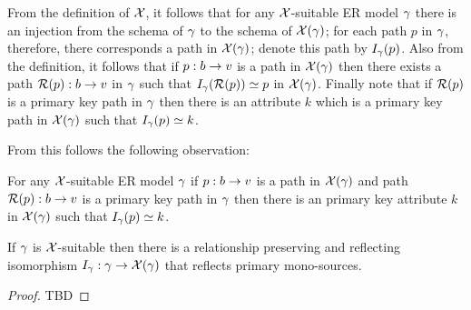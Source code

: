 From the definition of $\mathcal{X}$, it follows that for any $\mathcal{X}$-suitable ER model $\gamma$ there is an injection from the schema of $\gamma$ to the schema of $\mathcal{X}(\gamma)$; for each path $p$ in $\gamma$, therefore, there corresponds a path 
in $\mathcal{X}(\gamma)$; denote this path by  $I_\gamma(p)$. Also from the definition, it follows that
if $p:b \rightarrow v$ is a path in $\mathcal{X}(\gamma)$ then there exists a path $\mathcal{R}(p):b \rightarrow v$ in $\gamma$ such that $I_\gamma(\mathcal{R}(p)) \simeq p$ in $\mathcal{X}(\gamma)$. Finally note that if $\mathcal{R}(p)$ is a primary key path in $\gamma$ then there is an attribute $k$ which is a primary key path
in $\mathcal{X}(\gamma)$ such that $I_\gamma(p) \simeq k$. 


From this follows the following observation:

\begin{observation}
For any $\mathcal{X}$-suitable ER model $\gamma$ if $p:b \rightarrow v$ is a path in $\mathcal{X}(\gamma)$ and  path $\mathcal{R}(p):b \rightarrow v$ is a primary key path in $\gamma$  then there is an primary key attribute $k$ in $\mathcal{X}(\gamma)$ such that $I_\gamma(p) \simeq k$. 
\end{observation}

\begin{lemma}
If $\gamma$ is $\mathcal{X}$-suitable  then  there is a 
relationship preserving  and reflecting isomorphism $I_\gamma: \gamma \rightarrow \mathcal{X}(\gamma)$ that reflects primary mono-sources.
\end{lemma}
\begin{proof}
TBD 
\end{proof}

